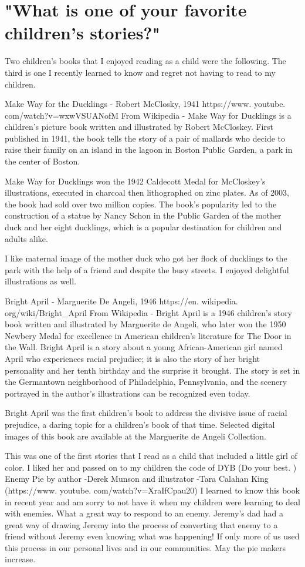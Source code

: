 \section{"What is one of your favorite children's stories?"}
Two children's books that I enjoyed reading as a child were the following.
The third is one I recently learned to know and regret not having to read to my children.

Make Way for the Ducklings - Robert McClosky, 1941 https://www.
youtube.
com/watch?v=wxwVSUANofM 
From Wikipedia - Make Way for Ducklings is a children's picture book written and illustrated by Robert McCloskey.
First published in 1941, the book tells the story of a pair of mallards who decide to raise their family on an island in the lagoon in Boston Public Garden, a park in the center of Boston.

Make Way for Ducklings won the 1942 Caldecott Medal for McCloskey's illustrations, executed in charcoal then lithographed on zinc plates.
As of 2003, the book had sold over two million copies.
The book's popularity led to the construction of a statue by Nancy Schon in the Public Garden of the mother duck and her eight ducklings, which is a popular destination for children and adults alike.

I like maternal image of the mother duck who got her flock of ducklings to the park with the help of a friend and despite the busy streets.
I enjoyed delightful illustrations as well.

Bright April - Marguerite De Angeli, 1946 https://en.
wikipedia.
org/wiki/Bright\_April 
From Wikipedia - Bright April is a 1946 children's story book written and illustrated by Marguerite de Angeli, who later won the 1950 Newbery Medal for excellence in American children's literature for The Door in the Wall.
Bright April is a story about a young African-American girl named April who experiences racial prejudice; it is also the story of her bright personality and her tenth birthday and the surprise it brought.
The story is set in the Germantown neighborhood of Philadelphia, Pennsylvania, and the scenery portrayed in the author's illustrations can be recognized even today.

Bright April was the first children's book to address the divisive issue of racial prejudice, a daring topic for a children's book of that time.
Selected digital images of this book are available at the Marguerite de Angeli Collection.

This was one of the first stories that I read as a child that included a little girl of color.
I liked her and passed on to my children the code of DYB (Do your best.
)
Enemy Pie by author -Derek Munson and illustrator -Tara Calahan King (https://www.
youtube.
com/watch?v=XraIfCpau20)
I learned to know this book in recent year and am sorry to not have it when my children were learning to deal with enemies.
What a great way to respond to an enemy.
Jeremy's dad had a great way of drawing Jeremy into the process of converting that enemy to a friend without Jeremy even knowing what was happening! If only more of us used this process in our personal lives and in our communities.
May the pie makers increase.






